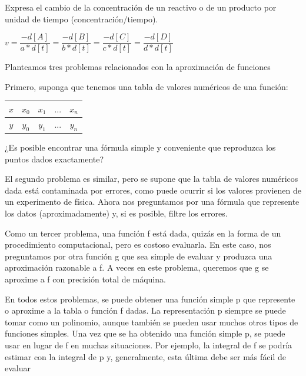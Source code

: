 \documentclass[10pt,a4paper]{article}
\begin{document}
\begin{multicols}{2}
		
		
		\noindent Expresa el cambio de la concentración de un reactivo o de un producto por unidad de tiempo (concentración/tiempo).\\
		
		\begin{center}
			{\scriptsize
				$v = \dfrac{-d[A]}{a*d[t]} = \dfrac{-d[B]}{b*d[t]} = \dfrac{-d[C]}{c*d[t]} = \dfrac{-d[D]}{d*d[t]}$ \\ 
				
			}
		\end{center}
		
		\vspace*{0.4cm}
		
		
		\noindent Planteamos tres problemas relacionados con la aproximación de funciones
		
		Primero, suponga que tenemos una tabla de valores numéricos de una función:
		
		\begin{center}
			\begin{tabular}{ c|c|c|c|c }
				
				$x$ & $x_0$ & $x_1$ & $...$ & $x_n$ \\ \hline
				$y$ & $y_0$ & $y_1$ & $...$ & $y_n$
			\end{tabular}
		\end{center}
		
		¿Es posible encontrar una fórmula simple y conveniente que reproduzca los puntos dados exactamente?
		
		El segundo problema es similar, pero se supone que la tabla de valores numéricos dada está contaminada por errores, como puede ocurrir si los valores provienen de un experimento de física. Ahora nos preguntamos por una fórmula que represente los datos (aproximadamente) y, si es posible, filtre los errores.
		
		Como un tercer problema, una función f está dada, quizás en la forma de un procedimiento computacional, pero es costoso evaluarla. En este caso, nos preguntamos por otra función g que sea simple de evaluar y produzca una aproximación razonable a f. A veces en este problema, queremos que g se aproxime a f con precisión total de máquina.
		
		En todos estos problemas, se puede obtener una función simple p que represente o aproxime a la tabla o función f dadas. La representación p siempre se puede tomar como un polinomio, aunque también se pueden usar muchos otros tipos de funciones simples. Una vez que se ha obtenido una función simple p, se puede usar en lugar de f en muchas situaciones. Por ejemplo, la integral de f se podría estimar con la integral de p y, generalmente, esta última debe ser más fácil de evaluar
		

\end{multicols}
\end{document}
